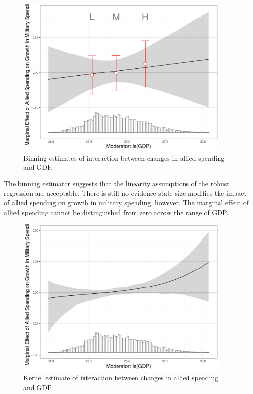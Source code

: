 \documentclass[12pt]{article}
\begin{document}
\begin{figure}
	\centering
		\includegraphics[width=0.95\textwidth]{inter-bin-abs.pdf}
		\caption{Binning estimates of interaction between changes in allied spending and GDP.}
	\label{fig:inter-bin-abs}
\end{figure}


The binning estimator suggests that the linearity assumptions of the robust regression are acceptable. 
There is still no evidence state size modifies the impact of allied spending on growth in military spending, however. 
The marginal effect of allied spending cannot be distinguished from zero across the range of GDP. 


\begin{figure}
	\centering
		\includegraphics[width=0.95\textwidth]{inter-kernel-abs.pdf}
	\caption{Kernel estimate of interaction between changes in allied spending and GDP.}
	\label{fig:inter-kernel-abs}
\end{figure}
\end{document}

